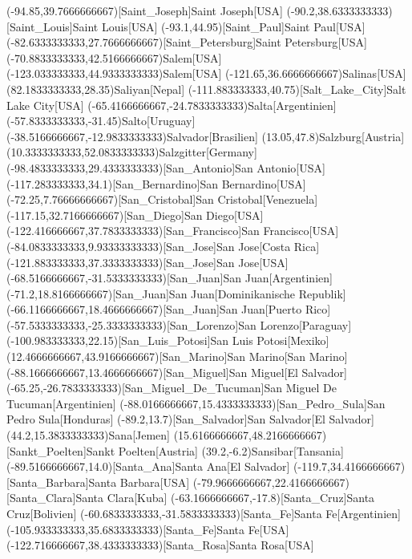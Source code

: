 \mapput(-94.85,39.7666666667)[Saint_Joseph]{Saint Joseph}[USA]
\mapput(-90.2,38.6333333333)[Saint_Louis]{Saint Louis}[USA]
\mapput(-93.1,44.95)[Saint_Paul]{Saint Paul}[USA]
\mapput(-82.6333333333,27.7666666667)[Saint_Petersburg]{Saint Petersburg}[USA]
\mapput(-70.8833333333,42.5166666667){Salem}[USA]
\mapput(-123.033333333,44.9333333333){Salem}[USA]
\mapput(-121.65,36.6666666667){Salinas}[USA]
\mapput(82.1833333333,28.35){Saliyan}[Nepal]
\mapput(-111.883333333,40.75)[Salt_Lake_City]{Salt Lake City}[USA]
\mapput(-65.4166666667,-24.7833333333){Salta}[Argentinien]
\mapput(-57.8333333333,-31.45){Salto}[Uruguay]
\mapput(-38.5166666667,-12.9833333333){Salvador}[Brasilien]
\mapput(13.05,47.8){Salzburg}[Austria]
\mapput(10.3333333333,52.0833333333){Salzgitter}[Germany]
\mapput(-98.4833333333,29.4333333333)[San_Antonio]{San Antonio}[USA]
\mapput(-117.283333333,34.1)[San_Bernardino]{San Bernardino}[USA]
\mapput(-72.25,7.76666666667)[San_Cristobal]{San Cristobal}[Venezuela]
\mapput(-117.15,32.7166666667)[San_Diego]{San Diego}[USA]
\mapput(-122.416666667,37.7833333333)[San_Francisco]{San Francisco}[USA]
\mapput(-84.0833333333,9.93333333333)[San_Jose]{San Jose}[Costa Rica]
\mapput(-121.883333333,37.3333333333)[San_Jose]{San Jose}[USA]
\mapput(-68.5166666667,-31.5333333333)[San_Juan]{San Juan}[Argentinien]
\mapput(-71.2,18.8166666667)[San_Juan]{San Juan}[Dominikanische Republik]
\mapput(-66.1166666667,18.4666666667)[San_Juan]{San Juan}[Puerto Rico]
\mapput(-57.5333333333,-25.3333333333)[San_Lorenzo]{San Lorenzo}[Paraguay]
\mapput(-100.983333333,22.15)[San_Luis_Potosi]{San Luis Potosi}[Mexiko]
\mapput(12.4666666667,43.9166666667)[San_Marino]{San Marino}[San Marino]
\mapput(-88.1666666667,13.4666666667)[San_Miguel]{San Miguel}[El Salvador]
\mapput(-65.25,-26.7833333333)[San_Miguel_De_Tucuman]{San Miguel De Tucuman}[Argentinien]
\mapput(-88.0166666667,15.4333333333)[San_Pedro_Sula]{San Pedro Sula}[Honduras]
\mapput(-89.2,13.7)[San_Salvador]{San Salvador}[El Salvador]
\mapput(44.2,15.3833333333){Sana}[Jemen]
\mapput(15.6166666667,48.2166666667)[Sankt_Poelten]{Sankt Poelten}[Austria]
\mapput(39.2,-6.2){Sansibar}[Tansania]
\mapput(-89.5166666667,14.0)[Santa_Ana]{Santa Ana}[El Salvador]
\mapput(-119.7,34.4166666667)[Santa_Barbara]{Santa Barbara}[USA]
\mapput(-79.9666666667,22.4166666667)[Santa_Clara]{Santa Clara}[Kuba]
\mapput(-63.1666666667,-17.8)[Santa_Cruz]{Santa Cruz}[Bolivien]
\mapput(-60.6833333333,-31.5833333333)[Santa_Fe]{Santa Fe}[Argentinien]
\mapput(-105.933333333,35.6833333333)[Santa_Fe]{Santa Fe}[USA]
\mapput(-122.716666667,38.4333333333)[Santa_Rosa]{Santa Rosa}[USA]
